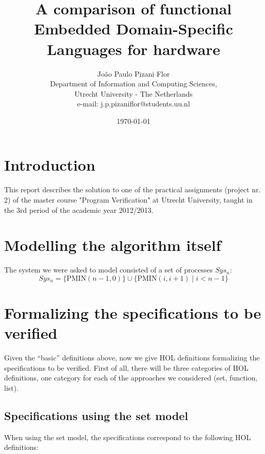 \documentclass[a4paper]{article}
\title{A comparison of functional Embedded Domain-Specific Languages for hardware}
\date{\today}
\author
{
    João Paulo Pizani Flor \\
    Department of Information and Computing Sciences, \\
    Utrecht University - The Netherlands \\
    e-mail: j.p.pizaniflor@students.uu.nl
}
\begin{document}
    \maketitle

    \section{Introduction}
    \label{sec:intro}
        This report describes the solution to one of the practical assignments (project nr. 2)
        of the master course "Program Verification" at Utrecht University, taught in the 3rd period
        of the academic year 2012/2013.

    \section{Modelling the algorithm itself}
    \label{sec:algorithm}
        The system we were asked to model consisted of a set of processes $ Sys_{n} $:
        \[
            Sys_{n} = \{ \text{PMIN}(n-1, 0) \} \cup \{ \text{PMIN}(i, i+1) \mid i < n-1 \}
        \]


    \section{Formalizing the specifications to be verified}
    \label{sec:specifications}

        Given the ``basic'' definitions above, now we give HOL definitions formalizing the
        specifications to be verified. First of all, there will be three categories of HOL
        definitions, one category for each of the approaches we considered (set, function, list).

        \subsection{Specifications using the set model}
        \label{subsec:spec_set}
            When using the set model, the specifications correspond to the following HOL
            definitions:
\end{document}
